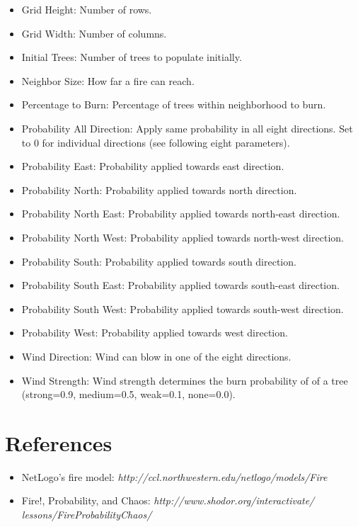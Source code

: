 \documentclass[11pt]{amsart}
\begin{document}
\begin{itemize}
\item Grid Height:  Number of rows.
\item Grid Width:  Number of columns.
\item Initial Trees:  Number of trees to populate initially.
\item Neighbor Size:  How far a fire can reach.
\item Percentage to Burn:  Percentage of trees within neighborhood to burn.
\item Probability All Direction:  Apply same probability in all eight directions.  Set to 0 for individual directions (see following eight parameters). 
\item Probability East:  Probability applied towards east direction.
\item Probability North:  Probability applied towards north direction.
\item Probability North East:  Probability applied towards north-east direction.
\item Probability North West:  Probability applied towards north-west direction.
\item Probability South:  Probability applied towards south direction.
\item Probability South East:  Probability applied towards south-east direction.
\item Probability South West:  Probability applied towards south-west direction.
\item Probability West:  Probability applied towards west direction.
\item Wind Direction:  Wind can blow in one of the eight directions.
\item Wind Strength:  Wind strength determines the burn probability of of a tree (strong=0.9, medium=0.5, weak=0.1, none=0.0). 
\end{itemize}
\vspace{.2in}

\section {References}

\begin{itemize}
\item NetLogo's fire model: \emph{http://ccl.northwestern.edu/netlogo/models/Fire}
\item Fire!, Probability, and Chaos: \emph{http://www.shodor.org/interactivate/ lessons/FireProbabilityChaos/}
\end{itemize}
\end{document}
